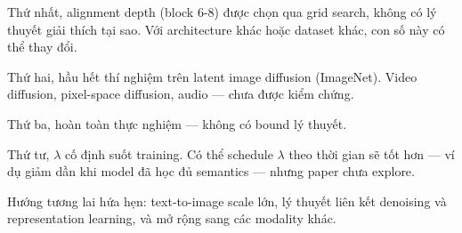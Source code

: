 \begin{frame}[t]
{    Thứ nhất, alignment depth (block 6-8) được chọn qua grid search,
    không có lý thuyết giải thích tại sao. Với architecture khác
    hoặc dataset khác, con số này có thể thay đổi.

    Thứ hai, hầu hết thí nghiệm trên latent image diffusion (ImageNet).
    Video diffusion, pixel-space diffusion, audio — chưa được kiểm chứng.

    Thứ ba, hoàn toàn thực nghiệm — không có bound lý thuyết.

    Thứ tư, $\lambda$ cố định suốt training. Có thể schedule $\lambda$
    theo thời gian sẽ tốt hơn — ví dụ giảm dần khi model đã học đủ
    semantics — nhưng paper chưa explore.

    Hướng tương lai hứa hẹn: text-to-image scale lớn, lý thuyết
    liên kết denoising và representation learning, và mở rộng sang
    các modality khác.
  }
\end{frame}

